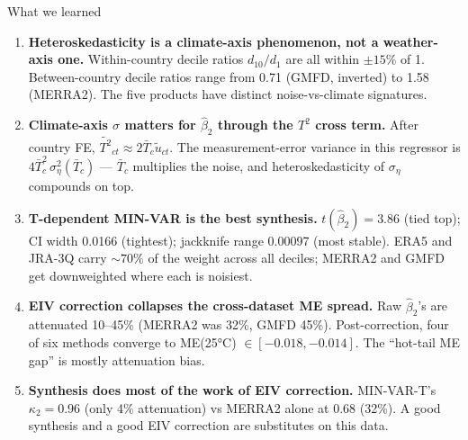 \documentclass[10pt,aspectratio=169]{beamer}
\begin{document}
\begin{frame}{What we learned}
  \begin{enumerate}
    \item \textbf{Heteroskedasticity is a climate-axis phenomenon, not a
          weather-axis one.} Within-country decile ratios $d_{10}/d_1$
          are all within $\pm 15\%$ of 1. Between-country decile ratios
          range from 0.71 (GMFD, inverted) to 1.58 (MERRA2). The five
          products have distinct noise-vs-climate signatures.

    \item \textbf{Climate-axis $\sigma$ matters for $\hat\beta_2$ through
          the $T^2$ cross term.} After country FE,
          $\widetilde{T^2}_{ct} \approx 2\bar T_c \tilde u_{ct}$. The
          measurement-error variance in this regressor is
          $4\bar T_c^2\,\sigma_\eta^2(\bar T_c)$ --- $\bar T_c$ multiplies
          the noise, and heteroskedasticity of $\sigma_\eta$ compounds on top.

    \item \textbf{T-dependent MIN-VAR is the best synthesis.}
          $t(\hat\beta_2) = 3.86$ (tied top); CI width 0.0166 (tightest);
          jackknife range 0.00097 (most stable). ERA5 and JRA-3Q carry
          $\sim\!70\%$ of the weight across all deciles; MERRA2 and GMFD
          get downweighted where each is noisiest.

    \item \textbf{EIV correction collapses the cross-dataset ME spread.}
          Raw $\hat\beta_2$'s are attenuated 10--45\% (MERRA2 was 32\%,
          GMFD 45\%). Post-correction, four of six methods converge to
          ME(25°C) $\in [-0.018, -0.014]$. The ``hot-tail ME gap'' is
          mostly attenuation bias.

    \item \textbf{Synthesis does most of the work of EIV correction.}
          MIN-VAR-T's $\kappa_2 = 0.96$ (only 4\% attenuation) vs MERRA2
          alone at 0.68 (32\%). A good synthesis and a good EIV correction
          are substitutes on this data.
  \end{enumerate}
\end{frame}
\end{document}
